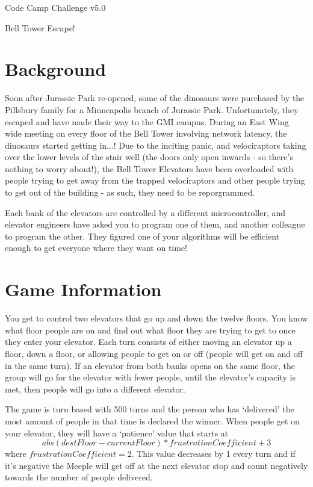 \documentclass{article}
\begin{document}
\centerline{\sc \large Code Camp Challenge v5.0}
\vspace{.5pc}
\centerline{\sc Bell Tower Escape!}
\vspace{2pc}

\section*{Background}
Soon after Jurassic Park re-opened, some of the dinosaurs were purchased by the Pillsbury family for a Minneapolis branch of Jurassic Park. Unfortunately, they escaped and have made their way to the GMI campus. During an East Wing wide meeting on every floor of the Bell Tower involving network latency, the dinosaurs started getting in...! Due to the inciting panic, and velociraptors taking over the lower levels of the stair well (the doors only open inwards - so there's nothing to worry about!), the Bell Tower Elevators have been overloaded with people trying to get away from the trapped velociraptors and other people trying to get out of the building - as such, they need to be reporgrammed.

Each bank of the elevators are controlled by a different microcontroller, and elevator engineers have asked you to program one of them, and another colleague to program the other. They figured one of your algorithms will be efficient enough to get everyone where they want on time!

\section*{Game Information}
You get to control two elevators that go up and down the twelve floors. You know what floor people are on and find out what floor they are trying to get to once they enter your elevator. Each turn consists of either moving an elevator up a floor, down a floor, or allowing people to get on or off (people will get on and off in the same turn). If an elevator from both banks opens on the same floor, the group will go for the elevator with fewer people, until the elevator's capacity is met, then people will go into a different elevator.

The game is turn based with 500 turns and the person who has `delivered' the most amount of people in that time is declared the winner. When people get on your elevator, they will have a `patience' value that starts at $$abs(destFloor-currentFloor) * frustrationCoefficient + 3$$ where $frustrationCoefficient = 2$. This value decreases by 1 every turn and if it's negative the Meeple will get off at the next elevator stop and count negatively towards the number of people delivered.
\end{document}
